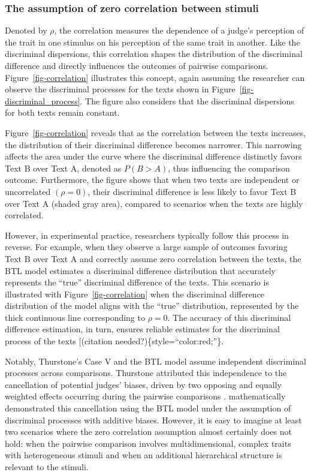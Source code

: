 \documentclass[
  authoryear,
  preprint,
  1p]{elsarticle}
\begin{document}
\subsubsection{The assumption of zero correlation between
stimuli}\label{sec-theory-issue1b}

Denoted by \(\rho\), the correlation measures the dependence of a
judge's perception of the trait in one stimulus on his perception of the
same trait in another. Like the discriminal dispersions, this
correlation shapes the distribution of the discriminal difference and
directly influences the outcomes of pairwise comparisons.
Figure~\ref{fig-correlation} illustrates this concept, again assuming
the researcher can observe the discriminal processes for the texts shown
in Figure~\ref{fig-discriminal_process}. The figure also considers that
the discriminal dispersions for both texts remain constant.

Figure~\ref{fig-correlation} reveals that as the correlation between the
texts increases, the distribution of their discriminal difference
becomes narrower. This narrowing affects the area under the curve where
the discriminal difference distinctly favors Text B over Text A, denoted
as \(P(B > A)\), thus influencing the comparison outcome. Furthermore,
the figure shows that when two texts are independent or uncorrelated
\((\rho=0)\), their discriminal difference is less likely to favor Text
B over Text A (shaded gray area), compared to scenarios when the texts
are highly correlated.

However, in experimental practice, researchers typically follow this
process in reverse. For example, when they observe a large sample of
outcomes favoring Text B over Text A and correctly assume zero
correlation between the texts, the BTL model estimates a discriminal
difference distribution that accurately represents the ``true''
discriminal difference of the texts. This scenario is illustrated with
Figure~\ref{fig-correlation} when the discriminal difference
distribution of the model aligns with the ``true'' distribution,
represented by the thick continuous line corresponding to \(\rho=0\).
The accuracy of this discriminal difference estimation, in turn, ensures
reliable estimates for the discriminal process of the texts {[}(citation
needed?)\{style=``color:red;''\}.

Notably, Thurstone's Case V and the BTL model assume independent
discriminal processes across comparisons. Thurstone attributed this
independence to the cancellation of potential judges' biases, driven by
two opposing and equally weighted effects occurring during the pairwise
comparisons \citep[pp.~268]{Thurstone_1927b}. \citet{Andrich_1978}
mathematically demonstrated this cancellation using the BTL model under
the assumption of discriminal processes with additive biases. However,
it is easy to imagine at least two scenarios where the zero correlation
assumption almost certainly does not hold: when the pairwise comparison
involves multidimensional, complex traits with heterogeneous stimuli and
when an additional hierarchical structure is relevant to the stimuli.
\end{document}
